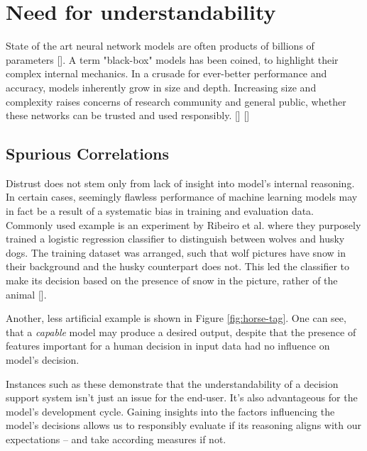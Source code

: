 
\section{Need for understandability}

State of the art neural network models are often products of billions of parameters []. A term "black-box" models has been coined, to highlight their complex internal mechanics. In a crusade for ever-better performance and accuracy, models inherently grow in size and depth. Increasing size and complexity raises concerns of research community and general public, whether these networks can be trusted and used responsibly. [] []


\subsection{Spurious Correlations}
Distrust does not stem only from lack of insight into model's internal reasoning. In certain cases, seemingly flawless performance of machine learning models may in fact be a result of a systematic bias in training and evaluation data. Commonly used example is an experiment by Ribeiro et al. where they purposely trained a logistic regression classifier to distinguish between wolves and husky dogs. The training dataset was arranged, such that wolf pictures have snow in their background and the husky counterpart does not. This led the classifier to make its decision based on the presence of snow in the picture, rather of the animal []. 


Another, less artificial example is shown in Figure \ref{fig:horse-tag}. One can see, that a \emph{capable} model may produce a desired output, despite that the presence of features important for a human decision in input data had no influence on model's decision.

Instances such as these demonstrate that the understandability of a decision support system isn't just an issue for the end-user. It's also advantageous for the model's development cycle. Gaining insights into the factors influencing the model's decisions allows us to responsibly evaluate if its reasoning aligns with our expectations -- and take according measures if not.


